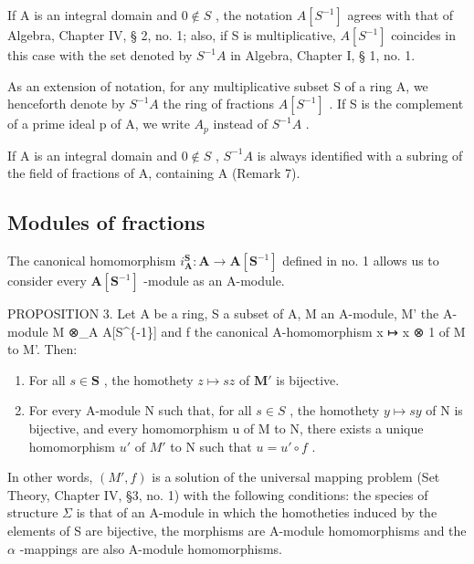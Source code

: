 If A is an integral domain and \(0 \notin S\) , the notation \(A[S^{-1}]\) agrees with that of Algebra, Chapter IV, § 2, no. 1; also, if S is multiplicative, \(A[S^{-1}]\) coincides in this case with the set denoted by \(S^{-1}A\) in Algebra, Chapter I, § 1, no. 1.

As an extension of notation, for any multiplicative subset S of a ring A, we henceforth denote by \(S^{-1}A\) the ring of fractions \(A[S^{-1}]\) . If S is the complement of a prime ideal p of A, we write \(A_{p}\) instead of \(S^{-1}A\) .

If A is an integral domain and \(0 \notin S\) , \(S^{-1}A\) is always identified with a subring of the field of fractions of A, containing A (Remark 7).

\subsection{Modules of fractions}

The canonical homomorphism \(i_{\mathbf{A}}^{\mathbf{S}} \colon \mathbf{A} \to \mathbf{A}[\mathbf{S}^{-1}]\) defined in no. 1 allows us to consider every \(\mathbf{A}[\mathbf{S}^{-1}]\) -module as an A-module.

PROPOSITION 3. Let A be a ring, S a subset of A, M an A-module, M' the A-module M ⊗\_A A{[}S\^{}\{-1\}{]} and f the canonical A-homomorphism x ↦ x ⊗ 1 of M to M'. Then:

\begin{enumerate}
\def\labelenumi{(\arabic{enumi})}
\item
  For all \(s \in \mathbf{S}\) , the homothety \(z \mapsto sz\) of \(\mathbf{M}'\) is bijective.
\item
  For every A-module N such that, for all \(s \in S\) , the homothety \(y \mapsto sy\) of N is bijective, and every homomorphism u of M to N, there exists a unique homomorphism \(u'\) of \(M'\) to N such that \(u = u' \circ f\) .
\end{enumerate}

In other words, \((M',f)\) is a solution of the universal mapping problem (Set Theory, Chapter IV, §3, no. 1) with the following conditions: the species of structure \(\Sigma\) is that of an A-module in which the homotheties induced by the elements of S are bijective, the morphisms are A-module homomorphisms and the \(\alpha\) -mappings are also A-module homomorphisms.

